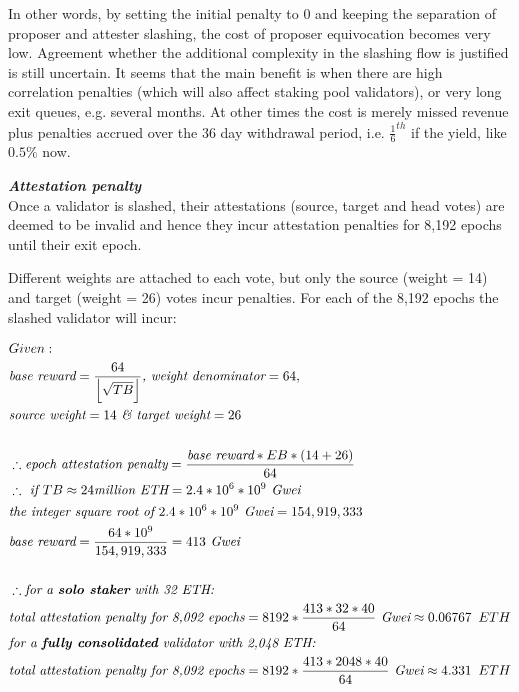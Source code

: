 In other words, by setting the initial penalty to 0 and keeping the separation of proposer and attester slashing, the cost of proposer equivocation becomes very low. Agreement whether the additional complexity in the slashing flow is justified is still uncertain. It seems that the main benefit is when there are high correlation penalties (which will also affect staking pool validators), or very long exit queues, e.g. several months. At other times the cost is merely missed revenue plus penalties accrued over the 36 day withdrawal period, i.e. $\frac{1}{6}^{th}$ if the yield, like $0.5\%$ now.



\noindent
\textbf{\textit{Attestation penalty}} \\
Once a validator is slashed, their attestations (source, target and head votes) are deemed to be invalid and hence they incur attestation penalties for 8,192 epochs until their exit epoch. 

Different weights are attached to each vote, but only the source (weight = 14) and target (weight = 26) votes incur penalties. For each of the 8,192 epochs the slashed validator will incur:

\begin{equation*}
\begin{split}
& Given:\\
& \textit{base reward} = \frac{64}{ \left\lfloor \sqrt{TB} \right\rfloor} \textit{, weight denominator} = 64, \\
& \textit{source weight} = 14 \textit{  \& target weight} = 26\\
& \\
& \therefore \textit{epoch attestation penalty} = \frac{\textit{base reward} * EB * (14 + 26)}{64} \\
& \therefore \textit{ if } TB \approx 24 \textit{million ETH} = 2.4 * 10^6 * 10^9 \textit{ Gwei}\\
& \textit{the integer square root of } 2.4 * 10^6 * 10^9 \textit{ Gwei} = 154,919,333 \\
& \textit{base reward} = \frac{64 * 10^9}{154,919,333} = 413 \textit{ Gwei} \\
& \\
& \therefore \textit{for a \textbf{solo staker} with 32 ETH:} \\
& \textit{total attestation penalty for 8,092 epochs} = 8192 * \frac{413*32*40}{64}  \textit{ Gwei}  \approx 0.06767 \texttt{ } ETH \\
& \textit{for a \textbf{fully consolidated} validator with 2,048 ETH:} \\
& \textit{total attestation penalty for 8,092 epochs} = 8192 * \frac{413*2048*40}{64}  \textit{ Gwei}\approx 4.331 \texttt{ } ETH \\
\end{split}
\end{equation*}

